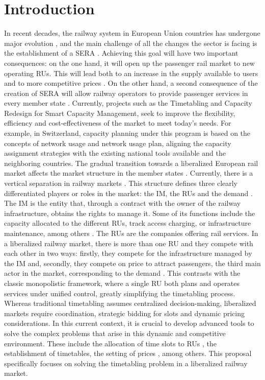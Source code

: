 \documentclass[Afour,sagev,times]{sagej}
\begin{document}
\maketitle

\section{Introduction}
\label{sec:introduction}
In recent decades, the railway system in European Union countries has undergone major evolution \cite{Ait2021}, and the main challenge of all the changes the sector is facing is the establishment of a \gls{SERA} \cite{COM2011}. Achieving this goal will have two important consequences: on the one hand, it will open up the passenger rail market to new operating \glspl{RU}. This will lead both to an increase in the supply available to users and to more competitive prices \cite{Caramello2017}. On the other hand, a second consequence of the creation of \gls{SERA} will allow railway operators to provide passenger services in every member state \cite{Caramello2017}. Currently, projects such as the Timetabling and Capacity Redesign for Smart Capacity Management, seek to improve the flexibility, efficiency and cost-effectiveness of the market to meet today's needs\cite{FTE}. For example, in Switzerland, capacity planning under this program is based on the concepts of network usage and network usage plan, aligning the capacity assignment strategies with the existing national tools available and the neighboring countries. The gradual transition towards a liberalized European rail market affects the market structure in the member states \cite{Ait2021}. Currently, there is a vertical separation in railway markets \cite{Bouf05}. This structure defines three clearly differentiated players or roles in the market: the \gls{IM}, the \glspl{RU} and the demand \cite{Besinovic2024}. The \gls{IM} is the entity that, through a contract with the owner of the railway infrastructure, obtains the rights to manage it. Some of its functions include the capacity allocated to the different \glspl{RU}, track access charging, or infrastructure maintenance, among others \cite{Pena2015}. The \glspl{RU} are the companies offering rail services. In a liberalized railway market, there is more than one \gls{RU} and they compete with each other in two ways: firstly, they compete for the infrastructure managed by the \gls{IM} and, secondly, they compete on price to attract passengers, the third main actor in the market, corresponding to the demand \cite{Link04}. This contrasts with the classic monopolistic framework, where a single \gls{RU} both plans and operates services under unified control, greatly simplifying the timetabling process. Whereas traditional timetabling assumes centralized decision-making, liberalized markets require coordination, strategic bidding for slots and dynamic pricing considerations. In this current context, it is crucial to develop advanced tools to solve the complex problems that arise in this dynamic and competitive environment. These include the allocation of time slots to \glspl{RU} \cite{Besinovic2024}, the establishment of timetables, the setting of prices \cite{Smoliner2018}, among others. This proposal specifically focuses on solving the timetabling problem in a liberalized railway market. 
\end{document}
